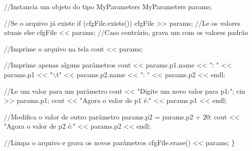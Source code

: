 \begin{DoxyCode}
     \textcolor{comment}{//Instancia um objeto do tipo MyParameters}
     MyParameters params;

     \textcolor{comment}{//Se o arquivo já existe}
     \textcolor{keywordflow}{if} (cfgFile.exists())
         cfgFile >> params; \textcolor{comment}{//Le os valores atuais}
     \textcolor{keywordflow}{else} 
         cfgFile << params; \textcolor{comment}{//Caso contrário, grava um com os valores padrão}

     \textcolor{comment}{//Imprime o arquivo na tela}
     cout << params;

     \textcolor{comment}{//Imprime apenas alguns parâmetros}
     cout << params.p1.name << \textcolor{stringliteral}{": "} << params.p1 << \textcolor{stringliteral}{"\(\backslash\)t"} << params.p2.name << \textcolor{stringliteral}{": "} << params.p2 << endl;

     \textcolor{comment}{//Le um valor para um parâmetro}
     cout << \textcolor{stringliteral}{"Digite um novo valor para p1:"};
     cin >> params.p1;
     cout << \textcolor{stringliteral}{"Agora o valor de p1 é:"} << params.p1 << endl;

     \textcolor{comment}{//Modifica o valor de outro parâmetro}
     params.p2 = params.p2 + 20;
     cout << \textcolor{stringliteral}{"Agora o valor de p2 é:"} << params.p2 << endl;

     \textcolor{comment}{//Limpa o arquivo e grava os novos parâmetros}
     cfgFile.erase() << params;
\}
\end{DoxyCode}
 